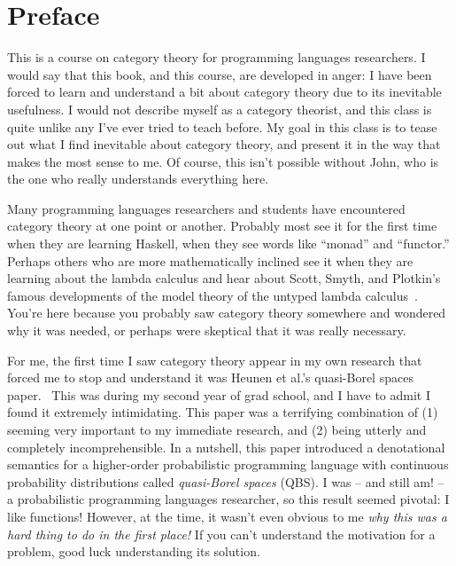 \chapter*{Preface}

This is a course on category theory for programming languages researchers.  I
would say that this book, and this course, are developed in anger: I have been
forced to learn and understand a bit about category theory due to its inevitable
usefulness. 
I would not describe myself as a category theorist, and this class is quite 
unlike any I've ever tried to teach before.
My goal in this class is to tease out what I find inevitable 
about category theory, and present it in the way that makes the most sense to 
me. Of course, this isn't possible without John, who is the one who 
really understands everything here.

Many programming languages researchers and students have encountered category
theory at one point or another. Probably most see it for the first time when
they are learning Haskell, when they see words like ``monad'' and ``functor.''
Perhaps others who are more mathematically inclined see it when they are
learning about the lambda calculus and hear about Scott, Smyth, and Plotkin's
famous developments of the model theory of the untyped lambda
calculus~\citep{smyth1982category}. You're here because you probably saw 
category theory somewhere and wondered why it was needed, or perhaps 
were skeptical that it was really necessary.

For me, the first time I saw category theory appear in my own research that 
forced me to stop and understand it was Heunen et al.'s quasi-Borel spaces paper.~\cite{heunen2017convenient} This was 
during my second year of grad school, and I have to admit I found it 
extremely intimidating. This paper was a terrifying combination of (1) seeming 
very important to my immediate research, and (2) being utterly and completely incomprehensible.
In a nutshell, this paper introduced a denotational semantics for a higher-order 
probabilistic programming language with continuous probability distributions called \emph{quasi-Borel spaces} (QBS).
I was -- and still am! -- a probabilistic programming languages researcher, so this result seemed pivotal: 
I like functions!
However, at the time, it wasn't even obvious to me \emph{why this was a hard thing to do
in the first place!} If you can't understand the motivation for a problem, 
good luck understanding its solution. 

